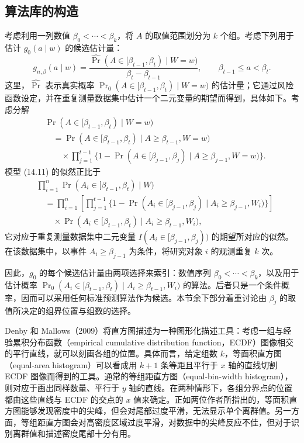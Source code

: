 \subsection{算法库的构造}

考虑利用一列数值 $\beta_0<\cdots<\beta_k$，将 $A$ 的取值范围划分为 $k$ 个组。考虑下列用于估计 $g_0(a\mid w)$ 的候选估计量：
\begin{equation}
 g_{n,\beta}(a\mid w)=
 \frac{\widehat{\Pr}(A\in[\beta_{t-1},\beta_t)\mid W=w)}{\beta_t-\beta_{t-1}},
 \qquad \beta_{t-1}\leq a<\beta_t.
 \tag{14.11}
\end{equation}
这里，$\widehat{\Pr}$ 表示真实概率 $\Pr_0(A\in[\beta_{t-1},\beta_t)\mid W=w)$ 的估计量；它通过风险函数设定，并在重复测量数据集中估计一个二元变量的期望而得到，具体如下。考虑分解
\[
\begin{aligned}
 &\Pr(A\in[\beta_{t-1},\beta_t)\mid W=w)\\
 &\quad=\Pr(A\in[\beta_{t-1},\beta_t)\mid A\geq\beta_{t-1},W=w)\\
 &\qquad{}\times\prod_{j=1}^{t-1}
 \{1-\Pr(A\in[\beta_{j-1},\beta_j)\mid A\geq\beta_{j-1},W=w)\}.
\end{aligned}
\]
模型 (14.11) 的似然正比于
\[
\begin{aligned}
 &\prod_{i=1}^n\Pr(A_i\in[\beta_{t-1},\beta_t)\mid W)\\
 &\quad=\prod_{i=1}^n\left[\prod_{j=1}^{t-1}
 \{1-\Pr(A_i\in[\beta_{j-1},\beta_j)\mid A_i\geq\beta_{j-1},W_i)\}\right]\\
 &\qquad{}\times\Pr(A_i\in[\beta_{t-1},\beta_t)\mid A_i\geq\beta_{t-1},W_i),
\end{aligned}
\]
它对应于重复测量数据集中二元变量 $I(A_i\in[\beta_{j-1},\beta_j))$ 的期望所对应的似然。在该数据集中，以事件 $A_i\geq\beta_{j-1}$ 为条件，将研究对象 $i$ 的观测重复 $k$ 次。

因此，$g_0$ 的每个候选估计量由两项选择来索引：数值序列 $\beta_0<\cdots<\beta_k$，以及用于估计概率 $\Pr_0(A_i\in[\beta_{t-1},\beta_t)\mid A_i\geq\beta_{t-1},W_i)$ 的算法。后者只是一个条件概率，因而可以采用任何标准预测算法作为候选。本节余下部分着重讨论由 $\beta_j$ 的取值所决定的组界位置与组数的选择。

Denby 和 Mallows（2009）将直方图描述为一种图形化描述工具：考虑一组与经验累积分布函数（empirical cumulative distribution function，ECDF）图像相交的平行直线，就可以刻画各组的位置。具体而言，给定组数 $k$，等面积直方图（equal-area histogram）可以看成用 $k+1$ 条等距且平行于 $x$ 轴的直线切割 ECDF 图像而得到的工具。通常的等组距直方图（equal-bin-width histogram），则对应于画出同样数量、平行于 $y$ 轴的直线。在两种情形下，各组分界点的位置都由这些直线与 ECDF 的交点的 $x$ 值来确定。正如两位作者所指出的，等面积直方图能够发现密度中的尖峰，但会对尾部过度平滑，无法显示单个离群值。另一方面，等组距直方图会对高密度区域过度平滑，对数据中的尖峰反应不佳，但对于识别离群值和描述密度尾部十分有用。


